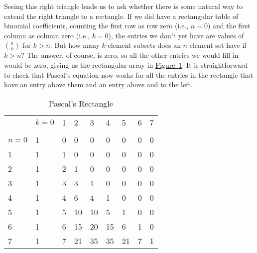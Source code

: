 \documentclass[10pt,]{book}
\theoremstyle{plain}
\theoremstyle{definition}
\numberwithin{equation}{chapter}
\newcommand{\hrulethin}  {\noalign{\hrule height 0.04em}}
\begin{document}
Seeing this right triangle leads us to ask whether there is some natural way to extend the right triangle to a rectangle. If we did have a rectangular table of binomial coefficients, counting the first row as row zero (i.e., \(n=0\)) and the first column as column zero (i.e., \(k=0\)), the entries we don't yet have are values of \(n\choose k\) for \(k>n\). But how many \(k\)-element subsets does an \(n\)-element set have if \(k>n\)? The answer, of course, is zero, so all the other entries we would fill in would be zero, giving us the rectangular array in \hyperref[Pascal_sRectangle]{Figure~\ref{Pascal_sRectangle}}. It is straightforward to check that Pascal's equation now works for all the entries in the rectangle that have an entry above them and an entry above and to the left.%
\begin{table}
\centering
\begin{tabular}{lllllllll}
&\(k=0\)&1&2&3&4&5&6&7\tabularnewline[0pt]
&&&&&&&&\tabularnewline\hrulethin
\(n=0\)&1&0&0&0&0&0&0&0\tabularnewline[0pt]
1&1&1&0&0&0&0&0&0\tabularnewline[0pt]
2&1&2&1&0&0&0&0&0\tabularnewline[0pt]
3&1&3&3&1&0&0&0&0\tabularnewline[0pt]
4&1&4&6&4&1&0&0&0\tabularnewline[0pt]
5&1&5&10&10&5&1&0&0\tabularnewline[0pt]
6&1&6&15&20&15&6&1&0\tabularnewline[0pt]
7&1&7&21&35&35&21&7&1
\end{tabular}
\caption{Pascal's Rectangle\label{Pascal_sRectangle}}
\end{table}
\end{document}
